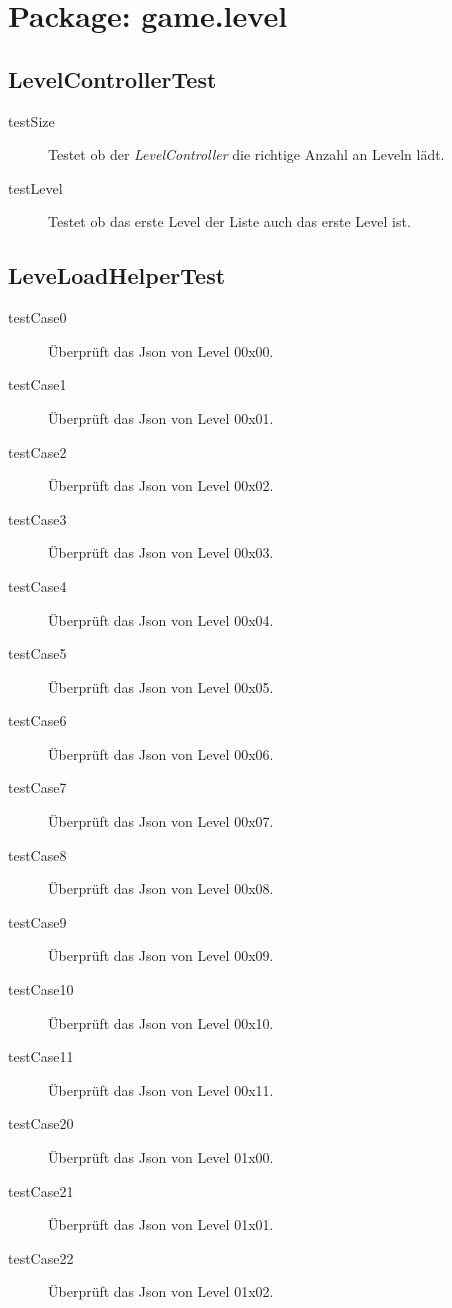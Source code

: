 \section{Package: game.level}

\subsection{LevelControllerTest}
	\begin{description}
		\item[testSize] Testet ob der \emph{LevelController} die richtige Anzahl an Leveln lädt.
		\item[testLevel] Testet ob das erste Level der Liste auch das erste Level ist.
	\end{description}

\subsection{LeveLoadHelperTest}
	\begin{description}
		\item[testCase0] Überprüft das Json von Level 00x00.
		\item[testCase1] Überprüft das Json von Level 00x01.
		\item[testCase2] Überprüft das Json von Level 00x02.
		\item[testCase3] Überprüft das Json von Level 00x03.
		\item[testCase4] Überprüft das Json von Level 00x04.
		\item[testCase5] Überprüft das Json von Level 00x05.
		\item[testCase6] Überprüft das Json von Level 00x06.
		\item[testCase7] Überprüft das Json von Level 00x07.
		\item[testCase8] Überprüft das Json von Level 00x08.
		\item[testCase9] Überprüft das Json von Level 00x09.
		\item[testCase10] Überprüft das Json von Level 00x10.
		\item[testCase11] Überprüft das Json von Level 00x11.
		\item[testCase20] Überprüft das Json von Level 01x00.
		\item[testCase21] Überprüft das Json von Level 01x01.
		\item[testCase22] Überprüft das Json von Level 01x02.



	\end{description}

